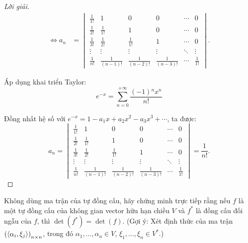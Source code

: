 \documentclass[class=linear-algebra,crop=false]{standalone}
\begin{document}
\begin{proof}[Lời giải]
\begin{align*}
		\Longleftrightarrow a_{n} & =
		\begin{vmatrix}
			\frac{1}{1!} & 1                & 0                & 0                & \cdots & 0            \\
			\frac{1}{2!} & \frac{1}{1!}     & 1                & 0                & \cdots & 0            \\
			\frac{1}{3!} & \frac{1}{2!}     & \frac{1}{1!}     & 1                & \cdots & 0            \\
			\vdots       & \vdots           & \vdots           & \vdots           & \ddots & \vdots       \\
			\frac{1}{n!} & \frac{1}{(n-1)!} & \frac{1}{(n-2)!} & \frac{1}{(n-3)!} & \cdots & \frac{1}{1!}
		\end{vmatrix}.
	\end{align*}

	\par Áp dụng khai triển Taylor:
	\[
		e^{-x} = \sum^{+\infty}_{n=0}\frac{(-1){}^{n}x^{n}}{n!}
	\]
	\par Đồng nhất hệ số với $e^{-x} = 1 - a_{1}x + a_{2}x^{2} - a_{3}x^{3} + \cdots$, ta được:
	\[
		a_{n} =
		\begin{vmatrix}
			\frac{1}{1!} & 1                & 0                & 0                & \cdots & 0            \\
			\frac{1}{2!} & \frac{1}{1!}     & 1                & 0                & \cdots & 0            \\
			\frac{1}{3!} & \frac{1}{2!}     & \frac{1}{1!}     & 1                & \cdots & 0            \\
			\vdots       & \vdots           & \vdots           & \vdots           & \ddots & \vdots       \\
			\frac{1}{n!} & \frac{1}{(n-1)!} & \frac{1}{(n-2)!} & \frac{1}{(n-3)!} & \cdots & \frac{1}{1!}
		\end{vmatrix}
		= \frac{1}{n!}.
	\]
\end{proof}

\begin{exercise}
	\par Không dùng ma trận của tự đồng cấu, hãy chứng minh trực tiếp rằng nếu $f$ là một tự đồng cấu của không gian vector hữu hạn chiều $V$ và $f^{*}$ là đồng cấu đối ngẫu của $f$, thì $\det(f^{*}) = \det(f)$. (Gợi ý: Xét định thức của ma trận ${\left(\left\langle{\alpha_{i},\xi_{j}}\right\rangle\right)}_{n\times n}$, trong đó $\alpha_{1},\ldots,\alpha_{n}\in V$, $\xi_{1},\ldots ,\xi_{n}\in V^{*}$.)
\end{exercise}
\end{document}
